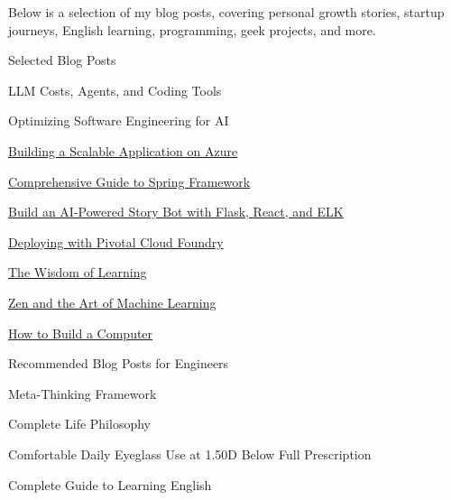 

\begin{cvparagraph}
  Below is a selection of my blog posts, covering personal growth stories, startup journeys, English learning, programming, geek projects, and more.
\end{cvparagraph}

\begin{cventries}

  \cventry
    {Selected Blog Posts} %
    {} %
    {} %
    {} %
    {
      \begin{cvitems}
        \item LLM Costs, Agents, and Coding Tools
        \item Optimizing Software Engineering for AI
        \item \href{https://lzwjava.com/azure-en}{Building a Scalable Application on Azure}
        \item \href{https://lzwjava.com/spring-en}{Comprehensive Guide to Spring Framework}
        \item \href{https://lzwjava.com/bot-en}{Build an AI-Powered Story Bot with Flask, React, and ELK}
        \item \href{https://lzwjava.com/pcf-en}{Deploying with Pivotal Cloud Foundry}
        \item \href{https://lzwjava.com/learning-wisdom}{The Wisdom of Learning}
        \item \href{https://lzwjava.com/zen-neural-en}{Zen and the Art of Machine Learning}
        \item \href{https://lzwjava.com/computer-en}{How to Build a Computer}
        \item Recommended Blog Posts for Engineers
        \item Meta-Thinking Framework
        \item Complete Life Philosophy
        \item Comfortable Daily Eyeglass Use at 1.50D Below Full Prescription
        \item Complete Guide to Learning English

\end{cvitems}}
\end{cventries}
